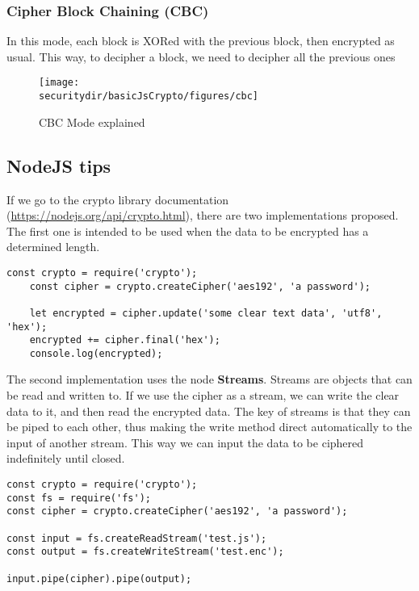 
\subsubsection{Cipher Block Chaining (CBC)}	

In this mode, each block is XORed with the previous block, then encrypted as usual. This way, to decipher a block, we need to decipher all the previous ones

\begin{figure}[htb]
	\begin{centering}
		\texttt{[image: \\securitydir/basicJsCrypto/figures/cbc]}
		\par\end{centering}
	\caption{\label{fig:cbc} CBC Mode explained}
\end{figure}

\subsection{NodeJS tips}
If we go to the crypto library documentation (\url{https://nodejs.org/api/crypto.html}), there are two implementations proposed. The first one is intended to be used when the data to be encrypted has a determined length.

\begin{lstlisting}[style=JavaScript]
	const crypto = require('crypto');
	const cipher = crypto.createCipher('aes192', 'a password');
	
	let encrypted = cipher.update('some clear text data', 'utf8', 'hex');
	encrypted += cipher.final('hex');
	console.log(encrypted);
\end{lstlisting}

The second implementation uses the node \textbf{Streams}. Streams are objects that can be read and written to. If we use the cipher as a stream, we can write the clear data to it, and then read the encrypted data. The key of streams is that they can be piped to each other, thus making the write method direct automatically to the input of another stream. This way we can input the data to be ciphered indefinitely until closed.

\begin{lstlisting}[style=JavaScript]
const crypto = require('crypto');
const fs = require('fs');
const cipher = crypto.createCipher('aes192', 'a password');

const input = fs.createReadStream('test.js');
const output = fs.createWriteStream('test.enc');

input.pipe(cipher).pipe(output);
\end{lstlisting}